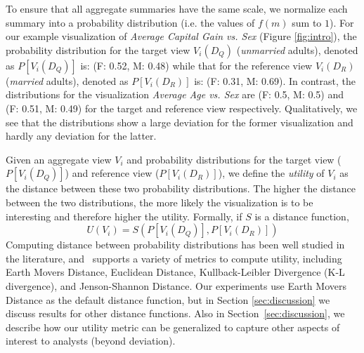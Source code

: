 To ensure that all aggregate summaries have the same scale, we normalize each 
summary into a probability distribution (i.e. the values of $f(m)$ sum to $1$).
For our example visualization of {\em Average Capital Gain vs. Sex} (Figure \ref{fig:intro}),
the probability distribution for the target view $V_i(D_Q)$ ({\em unmarried} adults), 
denoted as $P[V_i (D_Q)]$ is: 
(F: 0.52, M: 0.48) while that for the reference view $V_i(D_R)$ ({\em married} adults), 
denoted as $P[V_i (D_R)]$ is:
(F: 0.31, M: 0.69). 
In contrast, the distributions for the visualization {\em Average Age
vs. Sex} are (F: 0.5, M: 0.5) and (F: 0.51, M: 0.49) 
for the target and reference view respectively.
Qualitatively, we see that the distributions show a large deviation for
the former visualization and hardly any deviation for the latter.

Given an aggregate view $V_i$ and probability distributions for the
target view  ($P[V_i (D_Q)]$) and reference view ($P[V_i (D_R)]$), we
define the {\em utility} of $V_i$ as the distance between these two probability
distributions. The higher the distance between the two distributions, the more 
likely the
visualization is to be interesting and therefore higher the utility.
Formally, if $S$ is a distance function,
$$ U (V_i) = S ( P[V_i (D_Q)], P[V_i (D_R)] )$$
Computing distance between probability distributions has
been well studied in the literature, and \SeeDB\ supports a variety of metrics
to compute utility, including Earth Movers Distance, 
Euclidean Distance, Kullback-Leibler Divergence (K-L
divergence), and Jenson-Shannon
Distance. 
Our experiments use Earth Movers Distance as the default distance function,
but in Section \ref{sec:discussion} we discuss results for
other distance functions. 
Also in Section~\ref{sec:discussion}, we describe how our utility metric
can be generalized to capture other aspects of interest to analysts (beyond deviation).


